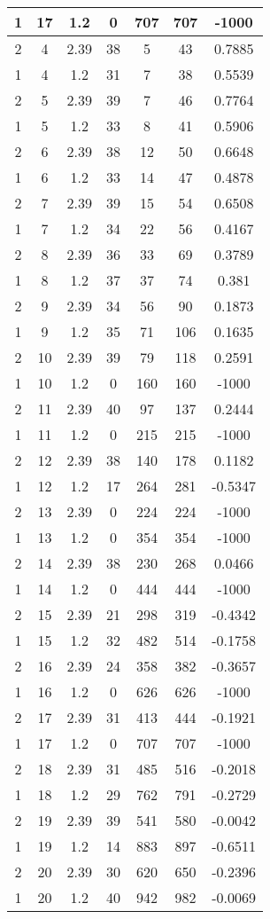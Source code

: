 \documentclass[letterpaper, 12pt]{article}
\begin{document}
\begin{longtable}{|c|c|c|c|c|c|c|}
\hline
1 & 17 & 1.2 & 0 & 707 & 707 & -1000 \\
\hline
2 & 4 & 2.39 & 38 & 5 & 43 & 0.7885 \\
\hline
1 & 4 & 1.2 & 31 & 7 & 38 & 0.5539 \\
\hline
2 & 5 & 2.39 & 39 & 7 & 46 & 0.7764 \\
\hline
1 & 5 & 1.2 & 33 & 8 & 41 & 0.5906 \\
\hline
2 & 6 & 2.39 & 38 & 12 & 50 & 0.6648 \\
\hline
1 & 6 & 1.2 & 33 & 14 & 47 & 0.4878 \\
\hline
2 & 7 & 2.39 & 39 & 15 & 54 & 0.6508 \\
\hline
1 & 7 & 1.2 & 34 & 22 & 56 & 0.4167 \\
\hline
2 & 8 & 2.39 & 36 & 33 & 69 & 0.3789 \\
\hline
1 & 8 & 1.2 & 37 & 37 & 74 & 0.381 \\
\hline
2 & 9 & 2.39 & 34 & 56 & 90 & 0.1873 \\
\hline
1 & 9 & 1.2 & 35 & 71 & 106 & 0.1635 \\
\hline
2 & 10 & 2.39 & 39 & 79 & 118 & 0.2591 \\
\hline
1 & 10 & 1.2 & 0 & 160 & 160 & -1000 \\
\hline
2 & 11 & 2.39 & 40 & 97 & 137 & 0.2444 \\
\hline
1 & 11 & 1.2 & 0 & 215 & 215 & -1000 \\
\hline
2 & 12 & 2.39 & 38 & 140 & 178 & 0.1182 \\
\hline
1 & 12 & 1.2 & 17 & 264 & 281 & -0.5347 \\
\hline
2 & 13 & 2.39 & 0 & 224 & 224 & -1000 \\
\hline
1 & 13 & 1.2 & 0 & 354 & 354 & -1000 \\
\hline
2 & 14 & 2.39 & 38 & 230 & 268 & 0.0466 \\
\hline
1 & 14 & 1.2 & 0 & 444 & 444 & -1000 \\
\hline
2 & 15 & 2.39 & 21 & 298 & 319 & -0.4342 \\
\hline
1 & 15 & 1.2 & 32 & 482 & 514 & -0.1758 \\
\hline
2 & 16 & 2.39 & 24 & 358 & 382 & -0.3657 \\
\hline
1 & 16 & 1.2 & 0 & 626 & 626 & -1000 \\
\hline
2 & 17 & 2.39 & 31 & 413 & 444 & -0.1921 \\
\hline
1 & 17 & 1.2 & 0 & 707 & 707 & -1000 \\
\hline
2 & 18 & 2.39 & 31 & 485 & 516 & -0.2018 \\
\hline
1 & 18 & 1.2 & 29 & 762 & 791 & -0.2729 \\
\hline
2 & 19 & 2.39 & 39 & 541 & 580 & -0.0042 \\
\hline
1 & 19 & 1.2 & 14 & 883 & 897 & -0.6511 \\
\hline
2 & 20 & 2.39 & 30 & 620 & 650 & -0.2396 \\
\hline
1 & 20 & 1.2 & 40 & 942 & 982 & -0.0069 \\
\hline
\end{longtable}
\end{document}
